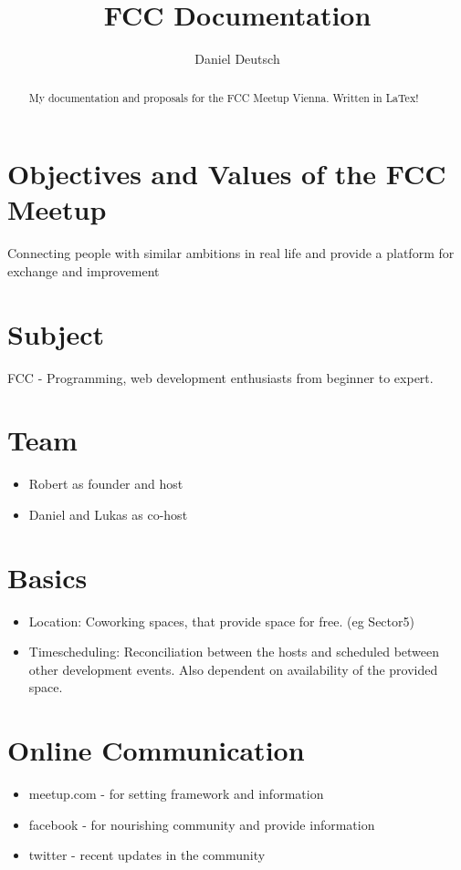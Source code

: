 \documentclass[a4paper]{article}
\title{FCC Documentation}
\author{Daniel Deutsch}
\begin{document}
\maketitle

\begin{abstract}
My documentation and proposals for the FCC Meetup Vienna. Written in LaTex!
\end{abstract}

\section{Objectives and Values of the FCC Meetup}
Connecting people with similar ambitions in real life and provide a platform for exchange and improvement


\section{Subject}
FCC - Programming, web development enthusiasts from beginner to expert.

\section{Team}
\begin{itemize}
\item Robert as founder and host
\item Daniel and Lukas as co-host
\end{itemize}

\section{Basics}
\begin{itemize}
\item Location: Coworking spaces, that provide space for free. (eg Sector5)
\item Timescheduling: Reconciliation between the hosts and scheduled between other development events. Also dependent on availability of the provided space.
\end{itemize}

\section{Online Communication}
\begin{itemize}
\item meetup.com - for setting framework and information
\item facebook - for nourishing community and provide information
\item twitter - recent updates in the community
\end{itemize}
\end{document}
